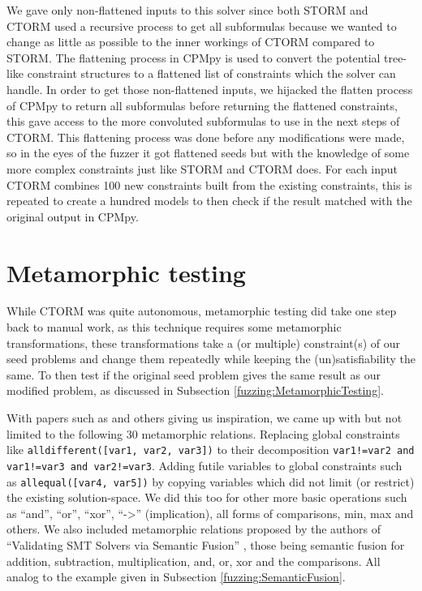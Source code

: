 We gave only non-flattened inputs to this solver since both STORM and CTORM used a recursive process to get all subformulas because we wanted to change as little as possible to the inner workings of CTORM compared to STORM. The flattening process in CPMpy is used to convert the potential tree-like constraint structures to a flattened list of constraints which the solver can handle. 
In order to get those non-flattened inputs, we hijacked the flatten process of CPMpy to return all subformulas before returning the flattened constraints, this gave access to the more convoluted subformulas to use in the next steps of CTORM. This flattening process was done before any modifications were made, so in the eyes of the fuzzer it got flattened seeds but with the knowledge of some more complex constraints just like STORM and CTORM does. For each input CTORM combines 100 new constraints built from the existing constraints, this is repeated to create a hundred models to then check if the result matched with the original output in CPMpy.

%


\section{Metamorphic testing}
\label{impl:Meta}
While CTORM was quite autonomous, metamorphic testing did take one step back to manual work, as this technique requires some metamorphic transformations, these transformations take a (or multiple) constraint(s) of our seed problems and change them repeatedly while keeping the (un)satisfiability the same. To then test if the original seed problem gives the same result as our modified problem, as discussed in Subsection \ref{fuzzing:MetamorphicTesting}. 

With papers such as \cite{50akgun2018metamorphic, 49usman2020testmc, 43YinYang} and others giving us inspiration, we came up with but not limited to the following 30 metamorphic relations. Replacing global constraints like \texttt{alldifferent([var1, var2, var3])} to their decomposition \texttt{var1!=var2 and var1!=var3 and var2!=var3}. Adding futile variables to global constraints such as \texttt{allequal([var4, var5])} by copying variables which did not limit (or restrict) the existing solution-space. We did this too for other more basic operations such as “and”, “or”, “xor”, “->” (implication), all forms of comparisons, min, max and others. We also included metamorphic relations proposed by the authors of “Validating SMT Solvers via Semantic Fusion” \cite{43YinYang}, those being semantic fusion for addition, subtraction, multiplication, and, or, xor and the comparisons. All analog to the example given in Subsection \ref{fuzzing:SemanticFusion}. 

